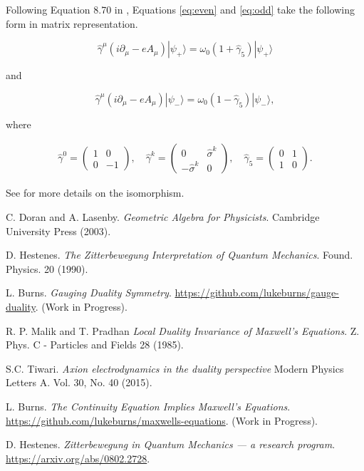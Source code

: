 \documentclass{article}
\begin{document}
  Following Equation 8.70 in \cite{gap}, Equations \ref{eq:even} and \ref{eq:odd} take the following form in matrix representation.

  \begin{equation}
    \hat \gamma^\mu (i \partial_\mu - e A_\mu) | \psi_+ \rangle = \omega_0 (1 + \hat \gamma_5) | \psi_+ \rangle
  \end{equation}

  and

  \begin{equation}
    \hat \gamma^\mu (i \partial_\mu - e A_\mu) | \psi_- \rangle = \omega_0 (1 - \hat \gamma_5) | \psi_- \rangle,
  \end{equation}

  where

  \begin{align}
    \hat \gamma^0 = \begin{pmatrix} 1 & 0 \\ 0 & -1 \end{pmatrix},\quad \hat \gamma^k = \begin{pmatrix} 0 & \hat \sigma^k \\ -\hat \sigma^k & 0 \end{pmatrix},\quad \hat \gamma_5 = \begin{pmatrix} 0 & 1 \\ 1 & 0 \end{pmatrix}.
  \end{align}

  See \cite{gap} for more details on the isomorphism.

  \begin{thebibliography}{9}
      C. Doran and A. Lasenby.
      \emph{Geometric Algebra for Physicists}. Cambridge University Press (2003).

      D. Hestenes.
      \emph{The Zitterbewegung Interpretation of Quantum Mechanics}.
      Found. Physics. 20 (1990).

      L. Burns.
      \emph{Gauging Duality Symmetry}.
      \url{https://github.com/lukeburns/gauge-duality}. (Work in Progress).

      R. P. Malik and T. Pradhan 
      \emph{Local Duality Invariance of Maxwell's Equations}.
      Z. Phys. C - Particles and Fields 28 (1985).

      S.C. Tiwari.
      \emph{Axion electrodynamics in the duality perspective}
      Modern Physics Letters A.
      Vol. 30, No. 40 (2015).

      L. Burns.
      \emph{The Continuity Equation Implies Maxwell's Equations}.
      \url{https://github.com/lukeburns/maxwells-equations}. (Work in Progress).

      D. Hestenes.
      \emph{Zitterbewegung in Quantum Mechanics --- a research program}.
      \url{https://arxiv.org/abs/0802.2728}.

  \end{thebibliography}
\end{document}

